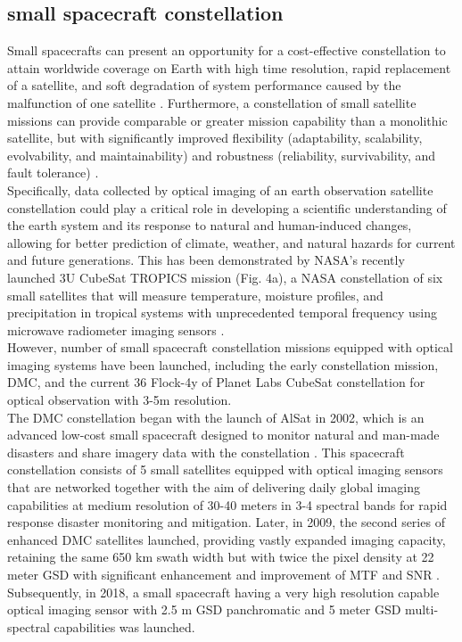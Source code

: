 \documentclass[final,5p,times,twocolumn]{elsarticle}
\begin{document}
\subsection{small spacecraft constellation}
Small spacecrafts can present an opportunity for a cost-effective constellation to attain worldwide coverage on Earth with high time resolution, rapid replacement of a satellite, and soft degradation of system performance caused by the malfunction of one satellite \citep{sandau2010small}. Furthermore, a constellation of small satellite missions can provide comparable or greater mission capability than a monolithic satellite, but with significantly improved flexibility (adaptability, scalability, evolvability, and maintainability) and robustness (reliability, survivability, and fault tolerance) \citep{bandyopadhyay2016review}. \\
Specifically, data collected by optical imaging of an earth observation satellite constellation  could play a critical role in developing a scientific understanding of the earth system and its response to natural and human-induced changes, allowing for better prediction of climate, weather, and natural hazards for current and future generations. This has been demonstrated by NASA's recently launched 3U CubeSat TROPICS mission (Fig. 4a), a NASA constellation of six small satellites that will measure temperature, moisture profiles, and precipitation in tropical systems with unprecedented temporal frequency using microwave radiometer imaging sensors \citep{blackwell2018overview}.\\
However, number of small spacecraft constellation missions equipped with optical imaging systems have been launched, including the early constellation mission, DMC, and the current 36 Flock-4y of Planet Labs CubeSat constellation for optical observation with 3-5m resolution. \\
The DMC constellation began with the launch of AlSat in 2002, which is an advanced low-cost small spacecraft designed to monitor natural and man-made disasters and share imagery data with the constellation \cite{surry2002}. This spacecraft constellation consists of 5 small satellites equipped with optical imaging sensors that are networked together with the aim of delivering daily global imaging capabilities at medium resolution of 30-40 meters in 3-4 spectral bands for rapid response disaster monitoring and mitigation.  Later, in 2009, the second series of enhanced DMC satellites launched, providing vastly expanded imaging capacity, retaining the same 650 km swath width but with twice the pixel density at 22 meter GSD with significant enhancement and improvement of MTF and SNR \citep{surry2002}.  Subsequently, in 2018, a small spacecraft having a very high resolution capable optical imaging sensor with 2.5 m GSD panchromatic and 5 meter GSD multi-spectral capabilities was launched.\\
\end{document}
